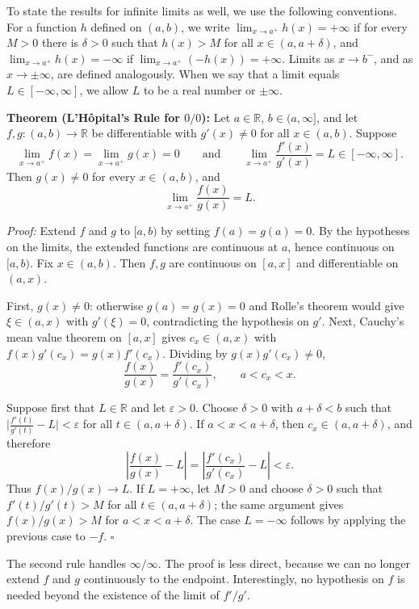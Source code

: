 \documentclass[a4paper,11pt,abstracton]{scrartcl}
\newcommand{\RR}{\mathbb{R}}
\theoremstyle{dotlessP}
\theoremstyle{dotlessS}
\theoremstyle{remark}
\theoremstyle{definition}
\begin{document}
To state the results for infinite limits as well, we use the following conventions. For a function $h$ defined on $(a,b)$, we write $\lim_{x\to a^+}h(x)=+\infty$ if for every $M>0$ there is $\delta>0$ such that $h(x)>M$ for all $x\in(a,a+\delta)$, and $\lim_{x\to a^+}h(x)=-\infty$ if $\lim_{x\to a^+}(-h(x))=+\infty$. Limits as $x\to b^-$, and as $x\to\pm\infty$, are defined analogously. When we say that a limit equals $L\in[-\infty,\infty]$, we allow $L$ to be a real number or $\pm\infty$.

\begin{problem_box}
\textbf{Theorem (L'H\^opital's Rule for $0/0$):}
Let $a\in\RR$, $b\in(a,\infty]$, and let $f,g:(a,b)\to\RR$ be differentiable with $g'(x)\ne0$ for all $x\in(a,b)$. Suppose
\[
    \lim_{x\to a^+}f(x)=\lim_{x\to a^+}g(x)=0
    \qquad\text{and}\qquad
    \lim_{x\to a^+}\frac{f'(x)}{g'(x)}=L\in[-\infty,\infty].
\]
Then $g(x)\ne0$ for every $x\in(a,b)$, and
\[
    \lim_{x\to a^+}\frac{f(x)}{g(x)}=L.
\]
\end{problem_box}

\begin{claim_box}
\textit{Proof:}
Extend $f$ and $g$ to $[a,b)$ by setting $f(a)=g(a)=0$. By the hypotheses on the limits, the extended functions are continuous at $a$, hence continuous on $[a,b)$. Fix $x\in(a,b)$. Then $f,g$ are continuous on $[a,x]$ and differentiable on $(a,x)$.

First, $g(x)\ne0$: otherwise $g(a)=g(x)=0$ and Rolle's theorem would give $\xi\in(a,x)$ with $g'(\xi)=0$, contradicting the hypothesis on $g'$. Next, Cauchy's mean value theorem on $[a,x]$ gives $c_x\in(a,x)$ with $f(x)g'(c_x)=g(x)f'(c_x)$. Dividing by $g(x)g'(c_x)\ne0$,
\[
    \frac{f(x)}{g(x)}=\frac{f'(c_x)}{g'(c_x)},\qquad a<c_x<x.
\]

Suppose first that $L\in\RR$ and let $\varepsilon>0$. Choose $\delta>0$ with $a+\delta<b$ such that $\bigl|\frac{f'(t)}{g'(t)}-L\bigr|<\varepsilon$ for all $t\in(a,a+\delta)$. If $a<x<a+\delta$, then $c_x\in(a,a+\delta)$, and therefore
\[
    \left|\frac{f(x)}{g(x)}-L\right|=\left|\frac{f'(c_x)}{g'(c_x)}-L\right|<\varepsilon.
\]
Thus $f(x)/g(x)\to L$. If $L=+\infty$, let $M>0$ and choose $\delta>0$ such that $f'(t)/g'(t)>M$ for all $t\in(a,a+\delta)$; the same argument gives $f(x)/g(x)>M$ for $a<x<a+\delta$. The case $L=-\infty$ follows by applying the previous case to $-f$.
\hfill$\square$
\end{claim_box}

The second rule handles $\infty/\infty$. The proof is less direct, because we can no longer extend $f$ and $g$ continuously to the endpoint. Interestingly, no hypothesis on $f$ is needed beyond the existence of the limit of $f'/g'$.
\end{document}
